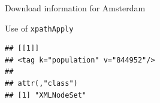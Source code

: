 \documentclass[
  ignorenonframetext,
]{beamer}
\begin{document}
\begin{frame}{Download information for Amsterdam}
\protect\hypertarget{download-information-for-amsterdam}{}

\end{frame}

\begin{frame}[fragile]{Use of \texttt{xpathApply}}
\protect\hypertarget{use-of-xpathapply}{}

\begin{verbatim}
## [[1]]
## <tag k="population" v="844952"/> 
## 
## attr(,"class")
## [1] "XMLNodeSet"
\end{verbatim}

\end{frame}
\end{document}
